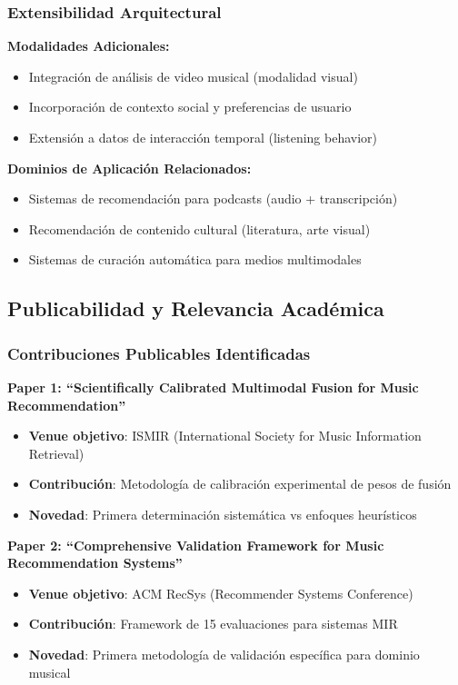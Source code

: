 \documentclass[12pt,a4paper]{article}
\begin{document}
\subsubsection{Extensibilidad Arquitectural}

\textbf{Modalidades Adicionales:}
\begin{itemize}
    \item Integración de análisis de video musical (modalidad visual)
    \item Incorporación de contexto social y preferencias de usuario
    \item Extensión a datos de interacción temporal (listening behavior)
\end{itemize}

\textbf{Dominios de Aplicación Relacionados:}
\begin{itemize}
    \item Sistemas de recomendación para podcasts (audio + transcripción)
    \item Recomendación de contenido cultural (literatura, arte visual)
    \item Sistemas de curación automática para medios multimodales
\end{itemize}

\subsection{Publicabilidad y Relevancia Académica}

\subsubsection{Contribuciones Publicables Identificadas}

\textbf{Paper 1: ``Scientifically Calibrated Multimodal Fusion for Music Recommendation''}
\begin{itemize}
    \item \textbf{Venue objetivo}: ISMIR (International Society for Music Information Retrieval)
    \item \textbf{Contribución}: Metodología de calibración experimental de pesos de fusión
    \item \textbf{Novedad}: Primera determinación sistemática vs enfoques heurísticos
\end{itemize}

\textbf{Paper 2: ``Comprehensive Validation Framework for Music Recommendation Systems''}
\begin{itemize}
    \item \textbf{Venue objetivo}: ACM RecSys (Recommender Systems Conference)
    \item \textbf{Contribución}: Framework de 15 evaluaciones para sistemas MIR
    \item \textbf{Novedad}: Primera metodología de validación específica para dominio musical
\end{itemize}
\end{document}
